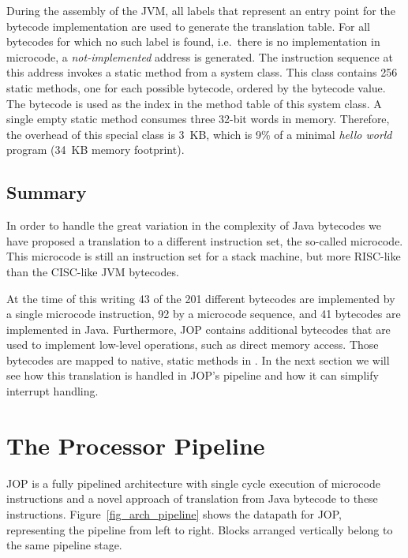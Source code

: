 During the assembly of the JVM, all labels that represent an entry
point for the bytecode implementation are used to generate the
translation table. For all bytecodes for which no such label is
found, i.e.\ there is no implementation in microcode, a
\emph{not-implemented} address is generated. The instruction sequence
at this address invokes a static method from a system class. This
class contains 256 static methods, one for each possible bytecode,
ordered by the bytecode value. The bytecode is used as the index in
the method table of this system class. A single empty static method
consumes three 32-bit words in memory. Therefore, the overhead of
this special class is 3~KB, which is 9\% of a minimal \emph{hello
world} program (34~KB memory footprint).

\subsection{Summary}

In order to handle the great variation in the complexity of Java
bytecodes we have proposed a translation to a different instruction
set, the so-called microcode. This microcode is still an instruction
set for a stack machine, but more RISC-like than the CISC-like JVM
bytecodes.

At the time of this writing 43 of the 201 different bytecodes are
implemented by a single microcode instruction, 92 by a microcode
sequence, and 41 bytecodes are implemented in Java. Furthermore, JOP
contains additional bytecodes that are used to implement low-level
operations, such as direct memory access. Those bytecodes are mapped
to native, static methods in . In the
next section we will see how this translation is handled in JOP's
pipeline and how it can simplify interrupt handling.


\section{The Processor Pipeline}
\label{sec:pipeline}

JOP is a fully pipelined architecture with single cycle execution of
microcode instructions and a novel approach of translation from Java
bytecode to these instructions. Figure~\ref{fig_arch_pipeline} shows
the datapath for JOP, representing the pipeline from left to right.
Blocks arranged vertically belong to the same pipeline stage.

